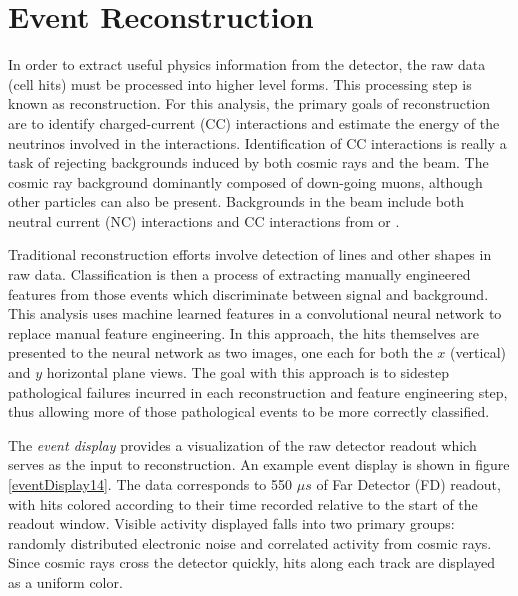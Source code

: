 \chapter{Event Reconstruction}
\label{reconstruction_chapter}

In order to extract useful physics information from the \nova detector, the raw data (cell hits) must be processed into higher level forms.
This processing step is known as reconstruction.
For this analysis, the primary goals of reconstruction are to identify \numu charged-current (CC) interactions and estimate the energy of the neutrinos involved in the interactions. Identification of \numu CC interactions is really a task of rejecting backgrounds induced by both cosmic rays and the \numi beam.  The cosmic ray background dominantly composed of down-going muons, although other particles can also be present.  Backgrounds in the \numi beam include both neutral current (NC) interactions and CC interactions from \nue or \nutau.

Traditional reconstruction efforts involve detection of lines and other shapes in raw data.  Classification is then a process of extracting manually engineered features from those events which discriminate between signal and background.
This analysis uses machine learned features in a convolutional neural network to replace manual feature engineering.
In this approach, the hits themselves are presented to the neural network as two images, one each for both the $x$ (vertical) and $y$ horizontal plane views.
The goal with this approach is to sidestep pathological failures incurred in each reconstruction and feature engineering step, thus allowing more of those pathological events to be more correctly classified.

The \nova \textit{event display} provides a visualization of the raw detector readout which serves as the input to reconstruction.
An example event display is shown in figure \ref{eventDisplay14}.
The data corresponds to 550 $\mu s$ of Far Detector (FD) readout, with hits colored according to their time recorded relative to the start of the readout window.
Visible activity displayed falls into two primary groups: randomly distributed electronic noise and correlated activity from cosmic rays.
Since cosmic rays cross the detector quickly, hits along each track are displayed as a uniform color.

